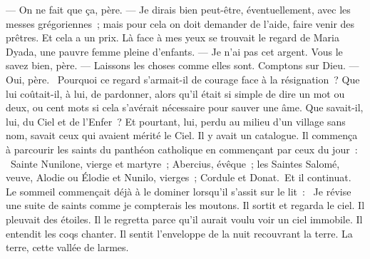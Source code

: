 \pend
%
\pstart
  \guillemotright --- On ne fait que ça, père.
\pend
%
\pstart
  \guillemotright --- Je dirais bien peut-être, éventuellement, avec les messes grégoriennes ; mais pour cela on doit demander de l’aide, faire venir des prêtres. Et cela a un prix.
\pend
%
\pstart
  \guillemotright Là face à mes yeux se trouvait le regard de Maria Dyada, une pauvre femme pleine d’enfants.
\pend
%
\pstart
  \guillemotright --- Je n’ai pas cet argent. Vous le savez bien, père.
\pend
%
\pstart
  \guillemotright --- Laissons les choses comme elles sont. Comptons sur Dieu.
\pend
%
\pstart
  \guillemotright --- Oui, père. \fg{}
\pend
%
\pstart
  Pourquoi ce regard s’armait-il de courage face à la résignation ? Que lui coûtait-il, à lui, de pardonner, alors qu’il était si simple de dire un mot ou deux, ou cent mots si cela s’avérait nécessaire pour sauver une âme. Que savait-il, lui, du Ciel et de l’Enfer ? Et pourtant, lui, perdu au milieu d’un village sans nom, savait ceux qui avaient mérité le Ciel. Il y avait un catalogue. Il commença à parcourir les saints du panthéon catholique en commençant par ceux du jour : \og{} Sainte Nunilone, vierge et martyre ; Abercius, évêque ; les Saintes Salomé, veuve, Alodie ou Élodie et Nunilo, vierges ; Cordule et Donat. \fg{}Et il continuat. Le sommeil commençait déjà à le dominer lorsqu’il s’assit sur le lit : \og{} Je révise une suite de saints comme je compterais les moutons.\fg{}
\pend
%
\pstart
  Il sortit et regarda le ciel. Il pleuvait des étoiles. Il le regretta parce qu’il aurait voulu voir un ciel immobile. Il entendit les coqs chanter. Il sentit l’enveloppe de la nuit recouvrant la terre. La terre, \og{}cette vallée de larmes\fg{}.
\pend
